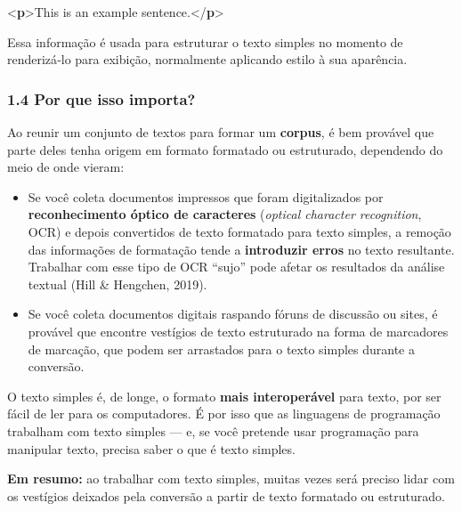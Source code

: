 \documentclass[
  brazilian,
  11pt,
]{article}
\newenvironment{Shaded}{\begin{snugshade}}{\end{snugshade}}
\newcommand{\DataTypeTok}[1]{\textcolor[rgb]{0.16,0.50,0.73}{#1}}
\newcommand{\KeywordTok}[1]{\textcolor[rgb]{0.81,0.81,0.76}{\textbf{#1}}}
\newcommand{\NormalTok}[1]{\textcolor[rgb]{0.81,0.81,0.76}{#1}}
\providecommand{\tightlist}{%
  \setlength{\itemsep}{0pt}\setlength{\parskip}{0pt}}
\begin{document}
\begin{Shaded}
\begin{Highlighting}[]
\DataTypeTok{\textless{}}\KeywordTok{p}\DataTypeTok{\textgreater{}}\NormalTok{This is an example sentence.}\DataTypeTok{\textless{}/}\KeywordTok{p}\DataTypeTok{\textgreater{}}
\end{Highlighting}
\end{Shaded}

Essa informação é usada para estruturar o texto simples no momento de
renderizá‑lo para exibição, normalmente aplicando estilo à sua
aparência.

\subsubsection{1.4 Por que isso importa?}\label{por-que-isso-importa}

Ao reunir um conjunto de textos para formar um \textbf{corpus}, é bem
provável que parte deles tenha origem em formato formatado ou
estruturado, dependendo do meio de onde vieram:

\begin{itemize}
\tightlist
\item
  Se você coleta documentos impressos que foram digitalizados por
  \textbf{reconhecimento óptico de caracteres} (\emph{optical character
  recognition}, OCR) e depois convertidos de texto formatado para texto
  simples, a remoção das informações de formatação tende a
  \textbf{introduzir erros} no texto resultante. Trabalhar com esse tipo
  de OCR ``sujo'' pode afetar os resultados da análise textual (Hill \&
  Hengchen, 2019).
\item
  Se você coleta documentos digitais raspando fóruns de discussão ou
  sites, é provável que encontre vestígios de texto estruturado na forma
  de marcadores de marcação, que podem ser arrastados para o texto
  simples durante a conversão.
\end{itemize}

O texto simples é, de longe, o formato \textbf{mais interoperável} para
texto, por ser fácil de ler para os computadores. É por isso que as
linguagens de programação trabalham com texto simples --- e, se você
pretende usar programação para manipular texto, precisa saber o que é
texto simples.

\begin{notebox}

\textbf{Em resumo:} ao trabalhar com texto simples, muitas vezes será
preciso lidar com os vestígios deixados pela conversão a partir de texto
formatado ou estruturado.

\end{notebox}
\end{document}
